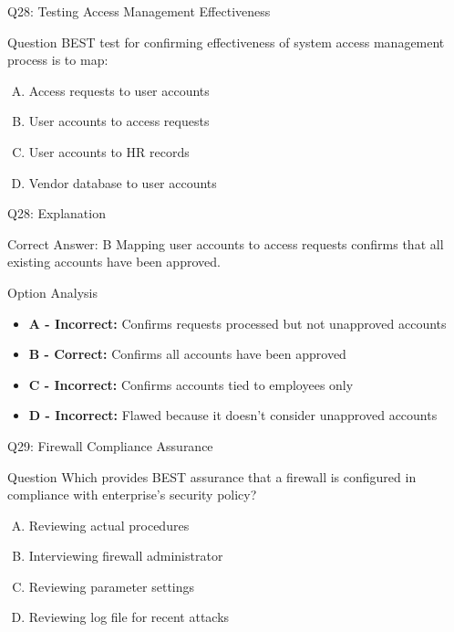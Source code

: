 \documentclass{beamer}
\begin{document}
	\begin{frame}{Q28: Testing Access Management Effectiveness}
		\begin{block}{Question}
			BEST test for confirming effectiveness of system access management process is to map:
		\end{block}
		\begin{enumerate}[(A)]
			\item Access requests to user accounts
			\item User accounts to access requests
			\item User accounts to HR records
			\item Vendor database to user accounts
		\end{enumerate}
	\end{frame}
	
	\begin{frame}{Q28: Explanation}
		\begin{block}{Correct Answer: B}
			Mapping user accounts to access requests confirms that all existing accounts have been approved.
		\end{block}
		\begin{block}{Option Analysis}
			\begin{itemize}
				\item \textbf{A - Incorrect:} Confirms requests processed but not unapproved accounts
				\item \textbf{B - Correct:} Confirms all accounts have been approved
				\item \textbf{C - Incorrect:} Confirms accounts tied to employees only
				\item \textbf{D - Incorrect:} Flawed because it doesn't consider unapproved accounts
			\end{itemize}
		\end{block}
	\end{frame}
	
	\begin{frame}{Q29: Firewall Compliance Assurance}
		\begin{block}{Question}
			Which provides BEST assurance that a firewall is configured in compliance with enterprise's security policy?
		\end{block}
		\begin{enumerate}[(A)]
			\item Reviewing actual procedures
			\item Interviewing firewall administrator
			\item Reviewing parameter settings
			\item Reviewing log file for recent attacks
		\end{enumerate}
	\end{frame}
	
\end{document}
